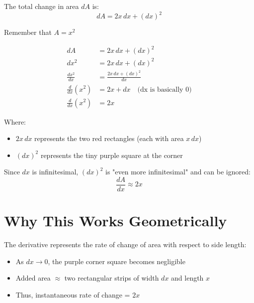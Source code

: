 \documentclass{article}
\begin{document}
The total change in area $dA$ is:
\[ dA = 2x\,dx + (dx)^2 \]

Remember that $A = x^2$

\[
\begin{aligned}
    dA &= 2x\,dx + (dx)^2 \\
    dx^2 &= 2x\,dx + (dx)^2 \\
    \frac{dx^2}{dx} &= \frac{2x\,dx + (dx)^2}{dx} \\
    \frac{d}{dx}(x^2) &= 2x + dx \quad \text{(dx is basically 0)} \\
    \frac{d}{dx}(x^2) &= 2x
\end{aligned}
\]


Where:
\begin{itemize}
    \item $2x\,dx$ represents the two red rectangles (each with area $x\,dx$)
    \item $(dx)^2$ represents the tiny purple square at the corner
\end{itemize}

Since $dx$ is infinitesimal, $(dx)^2$ is "even more infinitesimal" and can be ignored:
\[ \frac{dA}{dx} \approx 2x \]

\section*{Why This Works Geometrically}

\begin{center}
\end{center}

The derivative represents the rate of change of area with respect to side length:
\begin{itemize}
    \item As $dx \to 0$, the purple corner square becomes negligible
    \item Added area $\approx$ two rectangular strips of width $dx$ and length $x$
    \item Thus, instantaneous rate of change = $2x$
\end{itemize}
\end{document}
